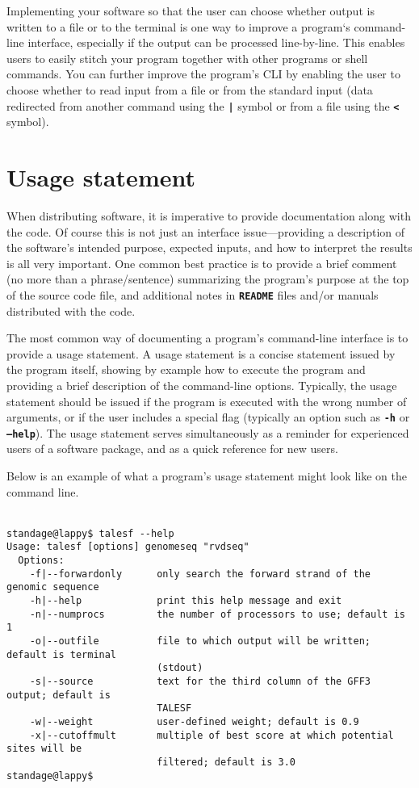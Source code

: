\documentclass{article}
\begin{document}
Implementing your software so that the user can choose whether output is written to a file or to the terminal is one way to improve a program`s command-line interface, especially if the output can be processed line-by-line. This enables users to easily stitch your program together with other programs or shell commands. You can further improve the program's CLI by enabling the user to choose whether to read input from a file or from the standard input (data redirected from another command using the \texttt{\textbf{|}} symbol or from a file using the \texttt{\textbf{<}} symbol).

\section{Usage statement}
When distributing software, it is imperative to provide documentation along with the code.
Of course this is not just an interface issue---providing a description of the software's intended purpose, expected inputs, and how to interpret the results is all very important.
One common best practice is to provide a brief comment (no more than a phrase/sentence) summarizing the program's purpose at the top of the source code file, and additional notes in \texttt{\textbf{README}} files and/or manuals distributed with the code.

The most common way of documenting a program's command-line interface is to provide a usage statement.
A usage statement is a concise statement issued by the program itself, showing by example how to execute the program and providing a brief description of the command-line options.
Typically, the usage statement should be issued if the program is executed with the wrong number of arguments, or if the user includes a special flag (typically an option such as \texttt{\textbf{-h}} or \texttt{\textbf{--help}}).
The usage statement serves simultaneously as a reminder for experienced users of a software package, and as a quick reference for new users.

Below is an example of what a program's usage statement might look like on the command line.
\\ \\
\begin{verbatim}
standage@lappy$ talesf --help
Usage: talesf [options] genomeseq "rvdseq"
  Options:
    -f|--forwardonly      only search the forward strand of the genomic sequence
    -h|--help             print this help message and exit
    -n|--numprocs         the number of processors to use; default is 1
    -o|--outfile          file to which output will be written; default is terminal
                          (stdout)
    -s|--source           text for the third column of the GFF3 output; default is
                          TALESF
    -w|--weight           user-defined weight; default is 0.9
    -x|--cutoffmult       multiple of best score at which potential sites will be
                          filtered; default is 3.0
standage@lappy$
\end{verbatim}
\\
\end{document}
